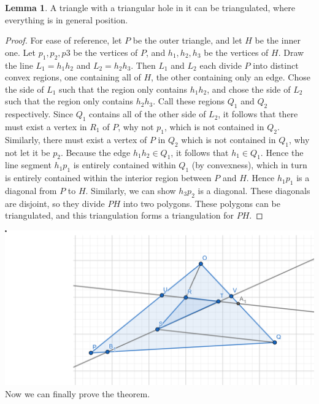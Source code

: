 \documentclass[12pt]{article}
\theoremstyle{definition}
\newtheorem{lemma}{Lemma}
\begin{document}
\begin{lemma}

A triangle with a triangular hole in it can be triangulated, where everything is in general position. 

\end{lemma}

\begin{proof}
For ease of reference, let $P$ be the outer triangle, and let $H$ be the inner one. Let $p_1, p_2, p3$ be the vertices of $P$, and $h_1, h_2, h_3$ be the vertices of $H$. Draw the line $L_1 = h_1h_2$ and $L_2 = h_2h_3$. Then $L_1$ and $L_2$ each divide $P$ into distinct convex regions, one containing all of $H$, the other containing only an edge. Chose the side of $L_1$ such that the region only contains $h_1h_2$, and chose the side of $L_2$ such that the region only contains $h_2h_3$. Call these regions $Q_1$ and $Q_2$ respectively. Since $Q_1$ contains all of the other side of $L_2$, it follows that there must exist a vertex in $R_1$ of $P$, why not $p_1$, which is not contained in $Q_2$. Similarly, there must exist a vertex of $P$ in $Q_2$ which is not contained in $Q_1$, why not let it be $p_2$. Because the edge $h_1h_2\in Q_1$, it follows that $h_1\in Q_1$. Hence the line segment $ h_1p_1$ is entirely contained within $Q_1$ (by convexness), which in turn is entirely contained within the interior region between $P$ and $H$. Hence $h_1p_1$ is a diagonal from $P$ to $H$. Similarly, we can show $h_3p_2$ is a diagonal. These diagonals are disjoint, so they divide $PH$ into two polygons. These polygons can be triangulated, and this triangulation forms a triangulation for $PH$.


\end{proof}

\includegraphics[scale=0.5]{triangularly_holy.png}
Now we can finally prove the theorem.
\end{document}
